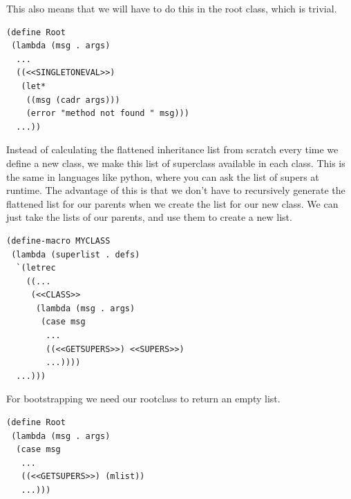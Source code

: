 \documentclass[10pt,a4paper]{scrartcl}
\begin{document}
\begin{multicols}{2}
This also means that we will have to do this in the root class, which is trivial.
\begin{lstlisting}
(define Root
 (lambda (msg . args)
  ...
  ((<<SINGLETONEVAL>>)
   (let*
    ((msg (cadr args)))
    (error "method not found " msg)))
  ...))
\end{lstlisting}

Instead of calculating the flattened inheritance list from scratch every time we define a new class, we make this list of superclass available in each class. This is the same in languages like python, where you can ask the list of supers at runtime. The advantage of this is that we don't have to recursively generate the flattened list for our parents when we create the list for our new class. We can just take the lists of our parents, and use them to create a new list.
\begin{lstlisting}
(define-macro MYCLASS
 (lambda (superlist . defs)
  `(letrec
    ((...
     (<<CLASS>>
      (lambda (msg . args)
       (case msg
        ...
        ((<<GETSUPERS>>) <<SUPERS>>)
        ...))))
  ...)))
\end{lstlisting}

For bootstrapping we need our rootclass to return an empty list.
\begin{lstlisting}
(define Root
 (lambda (msg . args)
  (case msg
   ...
   ((<<GETSUPERS>>) (mlist))
   ...)))
\end{lstlisting}


\end{multicols}
\end{document}
